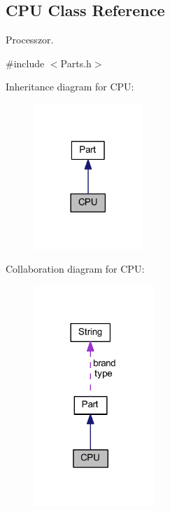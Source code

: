 \hypertarget{class_c_p_u}{}\subsection{C\+PU Class Reference}
\label{class_c_p_u}


Processzor.  




{\ttfamily \#include $<$Parts.\+h$>$}



Inheritance diagram for C\+PU\+:
\nopagebreak
\begin{figure}[H]
\begin{center}
\leavevmode
\includegraphics[width=117pt]{class_c_p_u__inherit__graph}
\end{center}
\end{figure}


Collaboration diagram for C\+PU\+:
\nopagebreak
\begin{figure}[H]
\begin{center}
\leavevmode
\includegraphics[width=129pt]{class_c_p_u__coll__graph}
\end{center}
\end{figure}
